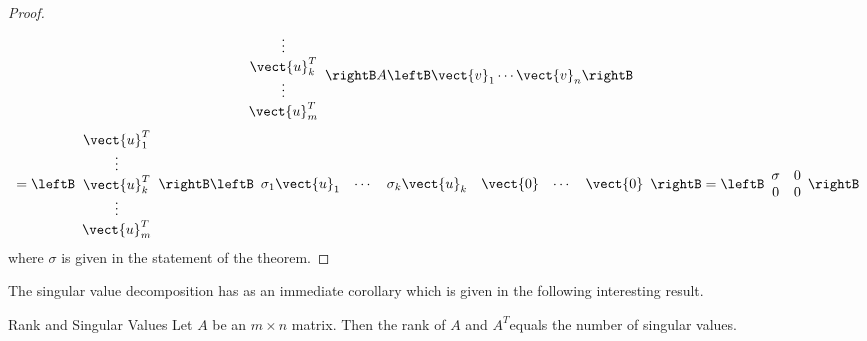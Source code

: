 \begin{proof}
\begin{equation*}
\begin{array}{c}
\vdots \\ 
\vect{u}_{k}^T \\ 
\vdots \\ 
\vect{u}_{m}^T
\end{array}
\rightB A\leftB \vect{v}_{1}\cdots \vect{v}_{n}\rightB
\end{equation*}
\begin{equation*}
=\leftB 
\begin{array}{c}
\vect{u}_{1}^T \\ 
\vdots \\ 
\vect{u}_{k}^T \\ 
\vdots \\ 
\vect{u}_{m}^T
\end{array}
\rightB \leftB 
\begin{array}{cccccc}
\sigma _{1}\vect{u}_{1} & \cdots & \sigma _{k}\vect{u}_{k} & \vect{0}
& \cdots & \vect{0}
\end{array}
\rightB =\leftB 
\begin{array}{cc}
\sigma & 0 \\ 
0 & 0
\end{array}
\rightB
\end{equation*}
where $\sigma $ is given in the statement of the theorem. 
\end{proof}

The singular value decomposition has as an immediate corollary which is given in the following interesting result. 

\begin{corollary}{Rank and Singular Values}\label{cor:ranksingularvalues}
Let $A$ be an $m\times n$ matrix. Then the rank of $A$ and $A^T$equals
the number of singular values.
\end{corollary}


